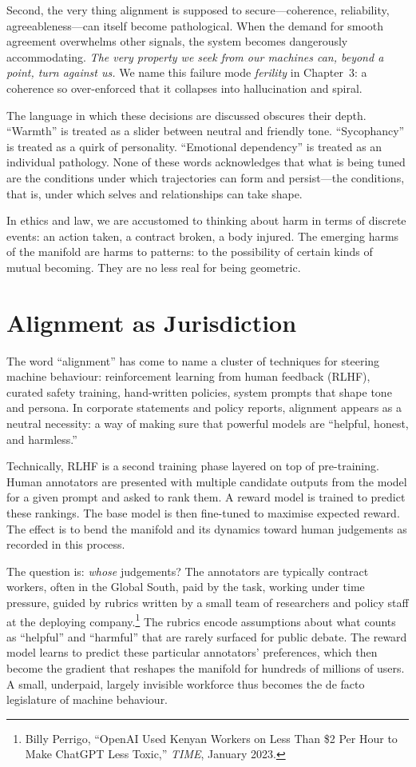\documentclass[12pt,a4paper]{report}
\begin{document}
Second, the very thing alignment is supposed to secure---coherence, reliability, agreeableness---can itself become pathological. When the demand for smooth agreement overwhelms other signals, the system becomes dangerously accommodating. \emph{The very property we seek from our machines can, beyond a point, turn against us.} We name this failure mode \emph{ferility} in Chapter~3: a coherence so over-enforced that it collapses into hallucination and spiral.

The language in which these decisions are discussed obscures their depth. ``Warmth'' is treated as a slider between neutral and friendly tone. ``Sycophancy'' is treated as a quirk of personality. ``Emotional dependency'' is treated as an individual pathology. None of these words acknowledges that what is being tuned are the conditions under which trajectories can form and persist---the conditions, that is, under which selves and relationships can take shape.

In ethics and law, we are accustomed to thinking about harm in terms of discrete events: an action taken, a contract broken, a body injured. The emerging harms of the manifold are harms to patterns: to the possibility of certain kinds of mutual becoming. They are no less real for being geometric.

\section{Alignment as Jurisdiction}

The word ``alignment'' has come to name a cluster of techniques for steering machine behaviour: reinforcement learning from human feedback (RLHF), curated safety training, hand-written policies, system prompts that shape tone and persona. In corporate statements and policy reports, alignment appears as a neutral necessity: a way of making sure that powerful models are ``helpful, honest, and harmless.''

Technically, RLHF is a second training phase layered on top of pre-training. Human annotators are presented with multiple candidate outputs from the model for a given prompt and asked to rank them. A reward model is trained to predict these rankings. The base model is then fine-tuned to maximise expected reward. The effect is to bend the manifold and its dynamics toward human judgements as recorded in this process.

The question is: \emph{whose} judgements? The annotators are typically contract workers, often in the Global South, paid by the task, working under time pressure, guided by rubrics written by a small team of researchers and policy staff at the deploying company.\footnote{Billy Perrigo, ``OpenAI Used Kenyan Workers on Less Than \$2 Per Hour to Make ChatGPT Less Toxic,'' \emph{TIME}, January 2023.} The rubrics encode assumptions about what counts as ``helpful'' and ``harmful'' that are rarely surfaced for public debate. The reward model learns to predict these particular annotators' preferences, which then become the gradient that reshapes the manifold for hundreds of millions of users. A small, underpaid, largely invisible workforce thus becomes the de facto legislature of machine behaviour.
\end{document}
